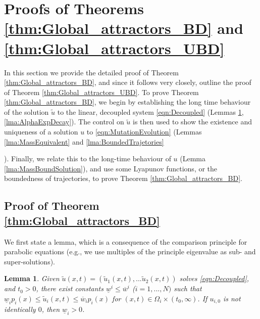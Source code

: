 \documentclass{article}
\newtheorem{lemma}{Lemma}[section]
\newtheorem{corollary}{Corollary}[section]
\def\strutdepth{\dp\strutbox}
\def \BVR#1{\strut\vadjust{\kern-\strutdepth\vtop to0pt{\vss\hbox to\hsize {\hskip\hsize\hskip5pt$\leftarrow$\hss\strut}}}{\em \textcolor{blue}{#1}}}
\newcommand{\md}[1]{{\color{red}Hong:  #1}}
\begin{document}
{%




\section{Proofs of Theorems \ref{thm:Global_attractors_BD} and \ref{thm:Global_attractors_UBD}}\label{sec:Proofs}
In this section we provide the detailed proof of Theorem \ref{thm:Global_attractors_BD}, and since it follows very closely, outline the proof of Theorem \ref{thm:Global_attractors_UBD}. To prove Theorem \ref{thm:Global_attractors_BD}, we begin by establishing the long time behaviour of the solution $\tilde{u}$ to the linear, decoupled system \eqref{eqn:Decoupled} (Lemmas \ref{lma:TransformBounds}, \ref{lma:AlphaExpDecay}). The control on $\tilde{u}$ is then used to show the existence and uniqueness of a solution $u$ to \eqref{eqn:MutationEvolution} (Lemmas \ref{lma:MassEquivalent} and \ref{lma:BoundedTrajetories}}). Finally, we relate this to the long-time behaviour of $u$ (Lemma \ref{lma:MassBoundSolution}), and  use some Lyapunov functions, or the boundedness of trajectories, to prove Theorem \ref{thm:Global_attractors_BD}. 



\subsection{Proof of Theorem \ref{thm:Global_attractors_BD}}
\label{sec: proof21}
We first state a lemma, which is a consequence of the comparison principle for parabolic equations (e.g., we use multiples of the principle eigenvalue as sub- and super-solutions).
\begin{lemma}\label{lma:TransformBounds}
    Given  $\tilde{u}(x,t)=(\tilde{u}_1(x,t),...\tilde{u}_2(x,t))$ solves \eqref{eqn:Decoupled}, and $t_0>0$, there exist constants $\underline{w}^ i\leq{}\overline{w}^i$ ($i=1,...,N)$ such that $\underline{w}_ip_i(x)\leq{}\tilde{u}_{i}(x,t)\leq{}\overline{w}_ip_i(x)$ for $(x,t)\in\Omega_i\times(t_0,\infty)$. If $u_{i,0}$ is not identically $0$, then $\underline{w}_i>0$.
\end{lemma}
\end{document}
